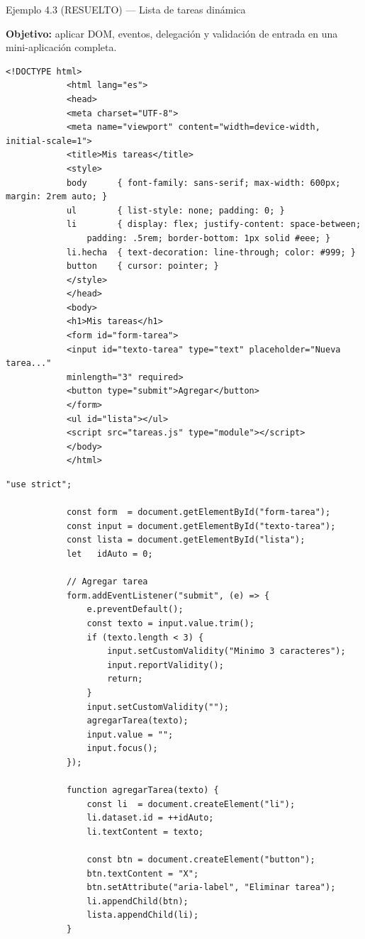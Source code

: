 \documentclass[11pt,a4paper,openany]{book}
\begin{document}
	\begin{cajaejemplo}{Ejemplo 4.3 (RESUELTO) — Lista de tareas dinámica}
		
		\textbf{Objetivo:} aplicar DOM, eventos, delegación y validación
		de entrada en una mini-aplicación completa.
		
		\begin{lstlisting}[style=html,numbers=none,caption={tareas.html},label=lst:4.13html]
			<!DOCTYPE html>
			<html lang="es">
			<head>
			<meta charset="UTF-8">
			<meta name="viewport" content="width=device-width, initial-scale=1">
			<title>Mis tareas</title>
			<style>
			body      { font-family: sans-serif; max-width: 600px; margin: 2rem auto; }
			ul        { list-style: none; padding: 0; }
			li        { display: flex; justify-content: space-between;
				padding: .5rem; border-bottom: 1px solid #eee; }
			li.hecha  { text-decoration: line-through; color: #999; }
			button    { cursor: pointer; }
			</style>
			</head>
			<body>
			<h1>Mis tareas</h1>
			<form id="form-tarea">
			<input id="texto-tarea" type="text" placeholder="Nueva tarea..."
			minlength="3" required>
			<button type="submit">Agregar</button>
			</form>
			<ul id="lista"></ul>
			<script src="tareas.js" type="module"></script>
			</body>
			</html>
		\end{lstlisting}
		
		\begin{lstlisting}[style=js,caption={tareas.js},label=lst:4.13js]
			"use strict";
			
			const form  = document.getElementById("form-tarea");
			const input = document.getElementById("texto-tarea");
			const lista = document.getElementById("lista");
			let   idAuto = 0;
			
			// Agregar tarea
			form.addEventListener("submit", (e) => {
				e.preventDefault();
				const texto = input.value.trim();
				if (texto.length < 3) {
					input.setCustomValidity("Minimo 3 caracteres");
					input.reportValidity();
					return;
				}
				input.setCustomValidity("");
				agregarTarea(texto);
				input.value = "";
				input.focus();
			});
			
			function agregarTarea(texto) {
				const li  = document.createElement("li");
				li.dataset.id = ++idAuto;
				li.textContent = texto;
				
				const btn = document.createElement("button");
				btn.textContent = "X";
				btn.setAttribute("aria-label", "Eliminar tarea");
				li.appendChild(btn);
				lista.appendChild(li);
			}
			

\end{lstlisting}
\end{cajaejemplo}
\end{document}
